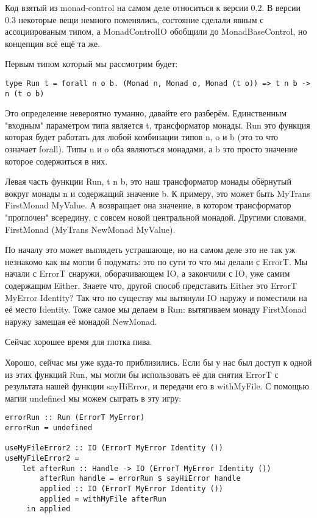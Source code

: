 \begin{remark}
Код взятый из monad-control на самом деле относиться к версии 0.2. В версии 0.3 некоторые вещи немного поменялись, состояние сделали явным с ассоциированым типом, а MonadControlIO обобщили до MonadBaseControl, но концепция всё ещё та же.
\end{remark}

Первым типом который мы рассмотрим будет:

\begin{lstlisting}
type Run t = forall n o b. (Monad n, Monad o, Monad (t o)) => t n b -> n (t o b)
\end{lstlisting}

Это определение невероятно туманно, давайте его разберём. Единственным "входным" параметром типа является t, трансформатор монады. Run это функция которая будет работать для любой комбинации типов n, o и b (это то что означает forall). Типы n и o оба являються монадами, а b это просто значение которое содержиться в них.

Левая часть функции Run, t n b, это наш трансформатор монады обёрнутый вокруг монады n и содержащий значение b. К примеру, это может быть MyTrans FirstMonad MyValue. А возвращает она значение, в котором трансформатор "проглочен" всередину, с совсем новой центральной монадой. Другими словами, FirstMonad (MyTrans NewMonad MyValue). 

По началу это может выглядеть устрашающе, но на самом деле это не так уж незнакомо как вы могли б подумать: это по сути то что мы делали с ErrorT. Мы начали с ErrorT снаружи, оборачивающем IO, а закончили с IO, уже самим содержащим Either. Знаете что, другой способ представить Either это ErrorT MyError Identity? Так что по существу мы вытянули IO наружу и поместили на её место Identity. Тоже самое мы делаем в Run: вытягиваем монаду FirstMonad наружу замещая её монадой NewMonad.

\begin{remark}
Сейчас хорошее время для глотка пива.
\end{remark}

Хорошо, сейчас мы уже куда-то приблизились. Если бы у нас был доступ к одной из этих функций Run, мы могли бы использовать её для снятия ErrorT с результата нашей функции sayHiError, и передачи его в withMyFile. С помощью магии undefined мы можем сыграть в эту игру:

\begin{lstlisting}
errorRun :: Run (ErrorT MyError)
errorRun = undefined

useMyFileError2 :: IO (ErrorT MyError Identity ())
useMyFileError2 =
    let afterRun :: Handle -> IO (ErrorT MyError Identity ())
        afterRun handle = errorRun $ sayHiError handle
        applied :: IO (ErrorT MyError Identity ())
        applied = withMyFile afterRun
     in applied
\end{lstlisting}

